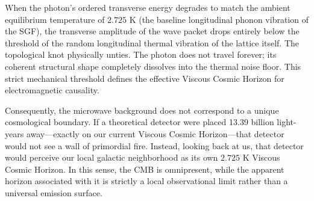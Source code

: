 When the photon's ordered transverse energy degrades to match the ambient equilibrium temperature of $2.725 \text{ K}$ (the baseline longitudinal phonon vibration of the SGF), the transverse amplitude of the wave packet drops entirely below the threshold of the random longitudinal thermal vibration of the lattice itself. The topological knot physically unties. The photon does not travel forever; its coherent structural shape completely dissolves into the thermal noise floor. This strict mechanical threshold defines the effective Viscous Cosmic Horizon for electromagnetic causality.

Consequently, the microwave background does not correspond to a unique cosmological boundary. If a theoretical detector were placed 13.39 billion light-years away---exactly on our current Viscous Cosmic Horizon---that detector would not see a wall of primordial fire. Instead, looking back at us, that detector would perceive our local galactic neighborhood as its own $2.725 \text{ K}$ Viscous Cosmic Horizon. In this sense, the CMB is omnipresent, while the apparent horizon associated with it is strictly a local observational limit rather than a universal emission surface.